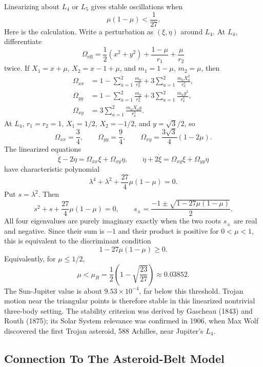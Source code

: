 \begin{remark}
Linearizing about \(L_4\) or \(L_5\) gives stable oscillations when
\[
  \mu(1-\mu)<\frac{1}{27}.
\]
Here is the calculation. Write a perturbation as
\((\xi,\eta)\) around \(L_4\). At \(L_4\),
differentiate
\[
  \Omega_{\mathrm{eff}}
  =
  \frac12(x^2+y^2)
  +
  \frac{1-\mu}{r_1}
  +
  \frac{\mu}{r_2}
\]
twice. If \(X_1=x+\mu\), \(X_2=x-1+\mu\), and
\(m_1=1-\mu\), \(m_2=\mu\), then
\[
\begin{aligned}
  \Omega_{xx}
  &=
  1-\sum_{a=1}^2\frac{m_a}{r_a^3}
  +3\sum_{a=1}^2\frac{m_aX_a^2}{r_a^5},\\
  \Omega_{yy}
  &=
  1-\sum_{a=1}^2\frac{m_a}{r_a^3}
  +3\sum_{a=1}^2\frac{m_ay^2}{r_a^5},\\
  \Omega_{xy}
  &=
  3\sum_{a=1}^2\frac{m_aX_ay}{r_a^5}.
\end{aligned}
\]
At \(L_4\), \(r_1=r_2=1\), \(X_1=1/2\),
\(X_2=-1/2\), and \(y=\sqrt3/2\), so
\[
  \Omega_{xx}=\frac34,\qquad
  \Omega_{yy}=\frac94,\qquad
  \Omega_{xy}=\frac{3\sqrt3}{4}(1-2\mu).
\]
The linearized equations
\[
  \ddot\xi-2\dot\eta=\Omega_{xx}\xi+\Omega_{xy}\eta,\qquad
  \ddot\eta+2\dot\xi=\Omega_{xy}\xi+\Omega_{yy}\eta
\]
have characteristic polynomial
\[
  \lambda^4+\lambda^2+\frac{27}{4}\mu(1-\mu)=0.
\]
Put \(s=\lambda^2\). Then
\[
  s^2+s+\frac{27}{4}\mu(1-\mu)=0,
  \qquad
  s_\pm=
  \frac{-1\pm\sqrt{1-27\mu(1-\mu)}}{2}.
\]
All four eigenvalues are purely imaginary exactly when the two roots
\(s_\pm\) are real and negative. Since their sum is \(-1\) and their product
is positive for \(0<\mu<1\), this is equivalent to the discriminant condition
\[
  1-27\mu(1-\mu)\ge0.
\]
Equivalently, for \(\mu\leq 1/2\),
\[
  \mu<\mu_R
  =
  \frac12\left(1-\sqrt{\frac{23}{27}}\right)
  \approx 0.03852.
\]
The Sun-Jupiter value is about \(9.53\times10^{-4}\), far below this threshold.
Trojan motion near the triangular points is therefore stable in this
linearized nontrivial three-body setting.
The stability criterion was derived by Gascheau (1843) and Routh (1875); its
Solar System relevance was confirmed in 1906, when Max Wolf discovered the
first Trojan asteroid, 588 Achilles, near Jupiter's \(L_4\).
\end{remark}

\subsection{Connection To The Asteroid-Belt Model}
\label{subsec:cr3bp-to-asteroid-belt}

